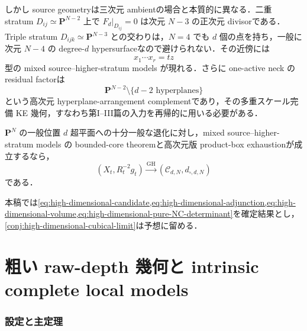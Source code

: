 \documentclass[a4paper,11pt]{ltjsarticle}
\numberwithin{equation}{section}
\theoremstyle{plain}
\theoremstyle{definition}
\theoremstyle{remark}
\newcommand{\PP}{\mathbf P}\newcommand{\CC}{\mathbf C}\newcommand{\RR}{\mathbf R}\newcommand{\ZZ}{\mathbf Z}\newcommand{\NN}{\mathbf N}
\begin{document}
しかし source geometryは三次元 ambientの場合と本質的に異なる．二重 stratum
$D_{ij}\simeq\PP^{N-2}$ 上で $F_d|_{D_{ij}}=0$ は次元 $N-3$ の正次元 divisorである．Triple stratum
$D_{ijk}\simeq\PP^{N-3}$ との交わりは，$N=4$ でも $d$ 個の点を持ち，一般に次元 $N-4$ の degree-$d$ hypersurfaceなので避けられない．その近傍には
\begin{equation}\label{eq:mixed-source-higher-stratum}
 x_1\cdots x_r=tz
\end{equation}
型の mixed source--higher-stratum models が現れる．さらに one-active neck の residual factorは
\[
 \PP^{N-2}\setminus\{d-2\text{ hyperplanes}\}
\]
という高次元 hyperplane-arrangement complementであり，その多重スケール完備 KE 幾何，すなわち第I--III篇の入力を再帰的に用いる必要がある．

\begin{conjecture}\label{conj:high-dimensional-cubical-limit}
$\PP^N$ の一般位置 $d$ 超平面への十分一般な退化に対し，mixed source--higher-stratum models の bounded-core theoremと高次元版 product-box exhaustionが成立するなら，
\[
 (X_t,R_t^{-2}g_t)
 \xrightarrow{\mathrm{GH}}
 (\mathcal C_{d,N},d_{\square,d,N})
\]
である．
\end{conjecture}

本稿では\cref{eq:high-dimensional-candidate,eq:high-dimensional-adjunction,eq:high-dimensional-volume,eq:high-dimensional-pure-NC-determinant}を確定結果とし，\cref{conj:high-dimensional-cubical-limit}は予想に留める．

\part{粗い raw-depth 幾何と intrinsic complete local models}
\section{設定と主定理}\label{coarse:sec:setup}
\end{document}
